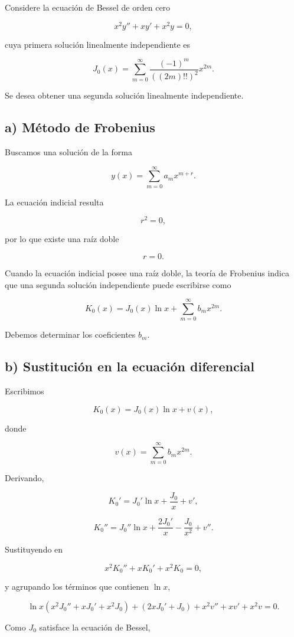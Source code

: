 \documentclass[11pt,spanish]{article}
\begin{document}
Considere la ecuación de Bessel de orden cero

\[
x^2y''+xy'+x^2y=0,
\]

cuya primera solución linealmente independiente es

\[
J_0(x)
=
\sum_{m=0}^{\infty}
\frac{(-1)^m}{((2m)!!)^2}x^{2m}.
\]

Se desea obtener una segunda solución linealmente independiente.

\subsection*{a) Método de Frobenius}

Buscamos una solución de la forma

\[
y(x)
=
\sum_{m=0}^{\infty}
a_mx^{m+r}.
\]

La ecuación indicial resulta

\[
r^2=0,
\]

por lo que existe una raíz doble

\[
r=0.
\]

Cuando la ecuación indicial posee una raíz doble, la teoría de Frobenius
indica que una segunda solución independiente puede escribirse como

\[
K_0(x)
=
J_0(x)\ln x
+
\sum_{m=0}^{\infty} b_mx^{2m}.
\]

Debemos determinar los coeficientes \(b_m\).

\subsection*{b) Sustitución en la ecuación diferencial}

Escribimos

\[
K_0(x)=J_0(x)\ln x+v(x),
\]

donde

\[
v(x)=\sum_{m=0}^{\infty}b_mx^{2m}.
\]

Derivando,

\[
K_0'
=
J_0'\ln x+\frac{J_0}{x}+v',
\]

\[
K_0''
=
J_0''\ln x
+\frac{2J_0'}{x}
-\frac{J_0}{x^2}
+v''.
\]

Sustituyendo en

\[
x^2K_0''+xK_0'+x^2K_0=0,
\]

y agrupando los términos que contienen \(\ln x\),

\[
\ln x
\left(
x^2J_0''+xJ_0'+x^2J_0
\right)
+
\left(
2xJ_0'+J_0
\right)
+
x^2v''+xv'+x^2v
=
0.
\]

Como \(J_0\) satisface la ecuación de Bessel,
\end{document}
